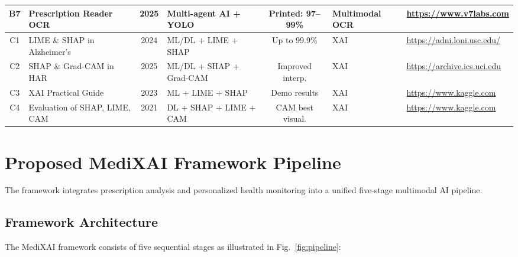 \documentclass[conference]{IEEEtran}
\begin{document}
\begin{table}[!htbp]
{\begin{tabular}{|c|l|c|l|c|l|l|}
B7 & Prescription Reader OCR & 2025 & Multi-agent AI + YOLO & Printed: 97--99\% & Multimodal OCR & \url{https://www.v7labs.com} \\
\hline
C1 & LIME \& SHAP in Alzheimer's & 2024 & ML/DL + LIME + SHAP & Up to 99.9\% & XAI & \url{https://adni.loni.usc.edu/} \\
C2 & SHAP \& Grad-CAM in HAR & 2025 & ML/DL + SHAP + Grad-CAM & Improved interp. & XAI & \url{https://archive.ics.uci.edu} \\
C3 & XAI Practical Guide & 2023 & ML + LIME + SHAP & Demo results & XAI & \url{https://www.kaggle.com} \\
C4 & Evaluation of SHAP, LIME, CAM & 2021 & DL + SHAP + LIME + CAM & CAM best visual. & XAI & \url{https://www.kaggle.com} \\
\hline
\end{tabular}
}
\end{table}
\FloatBarrier
\clearpage








\section{Proposed MediXAI Framework Pipeline}
\label{sec:pipeline}


The framework integrates prescription analysis and personalized health monitoring into a unified five-stage multimodal AI pipeline.

\subsection{Framework Architecture}

The MediXAI framework consists of five sequential stages as illustrated in Fig.~\ref{fig:pipeline}:
\end{document}
